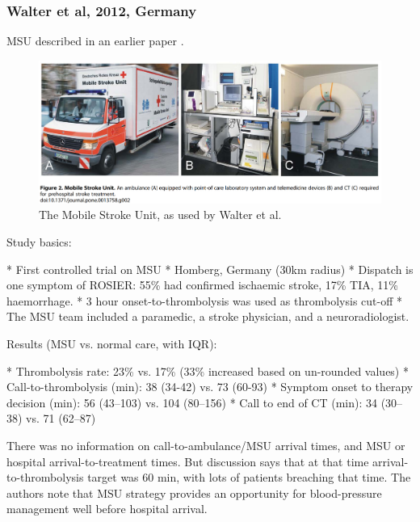 \subsubsection{Walter et al, 2012, Germany \cite{walter_diagnosis_2012}}

MSU described in an earlier paper \cite{walter_bringing_2010}.

\begin{figure}[ht]
    \centering
    \includegraphics[width=0.95\linewidth]{images_background/walter_msu}
    \caption{The Mobile Stroke Unit, as used by Walter et al.}
    \label{fig:walter_msu}
\end{figure}

Study basics:

\begin{markdown}
* First controlled trial on MSU
* Homberg, Germany (30km radius)
* Dispatch is one symptom of ROSIER: 55\% had confirmed ischaemic stroke, 17\% TIA, 11\% haemorrhage.
* 3 hour onset-to-thrombolysis was used as thrombolysis cut-off
* The MSU team included a paramedic, a stroke physician, and a neuroradiologist. 
\end{markdown}

Results (MSU vs. normal care, with IQR):

\begin{markdown}
* Thrombolysis rate: 23\% vs. 17\% (33\% increased based on un-rounded values)
* Call-to-thrombolysis (min): 38 (34-42) vs. 73 (60-93)
* Symptom onset to therapy decision (min): 56 (43–103) vs. 104 (80–156)
* Call to end of CT (min): 34 (30–38) vs. 71 (62–87)
\end{markdown}

There was no information on call-to-ambulance/MSU arrival times, and MSU or hospital arrival-to-treatment times. But discussion says that at that time arrival-to-thrombolysis target was 60 min, with lots of patients breaching that time. The authors note that MSU strategy provides an opportunity for  blood-pressure management well before hospital arrival.

